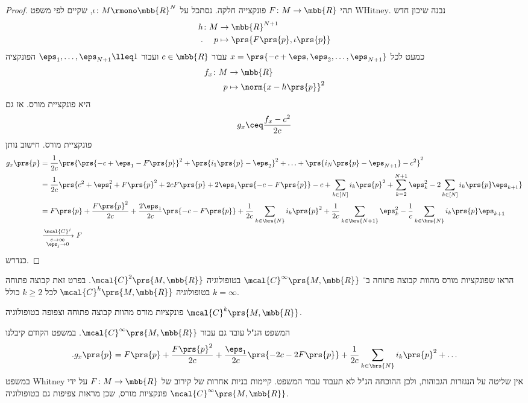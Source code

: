 \documentclass[a4paper,10pt,twoside,openany]{book}
\begin{document}
\begin{proof}
תהי
$F \colon M \to \mbb{R}$
פונקצייה חלקה.
נסתכל על
$\iota \colon M \rmono \mbb{R}^N$,
שקיים לפי משפט
\textenglish{WHitney}.
נבנה שיכון חדש
\begin{align*}
h \colon M &\to \mbb{R}^{N+1} \\
\text{.} \hphantom{h \colon} p&\mapsto \prs{F\prs{p}, \iota\prs{p}}
\end{align*}
כמעט לכל
$x = \prs{-c+\eps,\eps_2, \ldots, \eps_{N+1}}$
עבור
$c \in \mbb{R}$
ועבור
$\eps_1, \ldots, \eps_{N+1} \lleq 1$
הפונקציה
\begin{align*}
f_x \colon M &\to \mbb{R} \\
p &\mapsto \norm{x-h\prs{p}}^2
\end{align*}
היא פונקציית מורס.
אז גם
\begin{align*}
g_x \ceq \frac{f_x - c^2}{2c}
\end{align*}
פונקציית מורס.
חישוב נותן
\begin{align*}
g_x\prs{p} &= \frac{1}{2c} \prs{\prs{-c + \eps_1 - F\prs{p}}^2 + \prs{i_1\prs{p} - \eps_2}^2 + \ldots + \prs{i_N\prs{p} - \eps_{N+1}} - c^2}^2
\\&= \frac{1}{2c} \prs{c^2 + \eps_1^2 + F\prs{p}^2 + 2c F\prs{p} + 2 \eps_1\prs{-c-F\prs{p}} - c + \sum_{k \in [N]} i_k\prs{p}^2 + \sum_{k = 2}^{N+1} \eps_k^2 - 2 \sum_{k \in [N]} i_k\prs{p} \eps_{k+1}}
\\&= F\prs{p} + \frac{F\prs{p}^2}{2c} + \frac{2 \eps_1}{2c} \prs{-c - F\prs{p}} + \frac{1}{2c} \sum_{k \in \brs{N}} i_k\prs{p}^2 + \frac{1}{2c} \sum_{k \in \brs{N+1}} \eps_k^2 - \frac{1}{c} \sum_{k \in \brs{N}} i_k\prs{p} \eps_{k+1}
\\&\xrightarrow[\substack{c \to \infty \\ \eps_j \to 0}]{\mcal{C}^j} F
\end{align*}
כנדרש.
\end{proof}

\begin{exercise}
הראו שפונקציות מורס מהוות קבוצה פתוחה ב־%
$\mcal{C}^\infty\prs{M,\mbb{R}}$
בטופולוגיה
$\mcal{C}^2\prs{M,\mbb{R}}$.
בפרט זאת קבוצה פתוחה בטופולוגיה
$\mcal{C}^k\prs{M,\mbb{R}}$
לכל
$k \geq 2$
כולל
$k = \infty$.
\end{exercise}

\begin{corollary}
פונקציות מורס מהוות קבוצה פתוחה וצפופה בטופולוגיה
$\mcal{C}^k\prs{M,\mbb{R}}$.
\end{corollary}

\begin{remark}
המשפט הנ"ל עובד גם עבור
$\mcal{C}^\infty\prs{M,\mbb{R}}$.
במשפט הקודם קיבלנו
\[\text{.} g_x\prs{p} = F\prs{p} + \frac{F\prs{p}^2}{2c} + \frac{\eps_1}{2c} \prs{- 2c - 2F\prs{p}} + \frac{1}{2c} \sum_{k \in \brs{N}} i_k\prs{p}^2 + \ldots\]
במשפט
\textenglish{Whitney}
אין שליטה על הנגזרות הגבוהות, ולכן ההוכחה הנ"ל לא תעבוד עבור המשפט.
קיימות בניות אחרות של קירוב של
$F \colon M \to \mbb{R}$
על ידי פונקציות מורס, שכן מראות צפיפות גם בטופולוגיה
$\mcal{C}^\infty\prs{M,\mbb{R}}$.
\end{remark}
\end{document}
